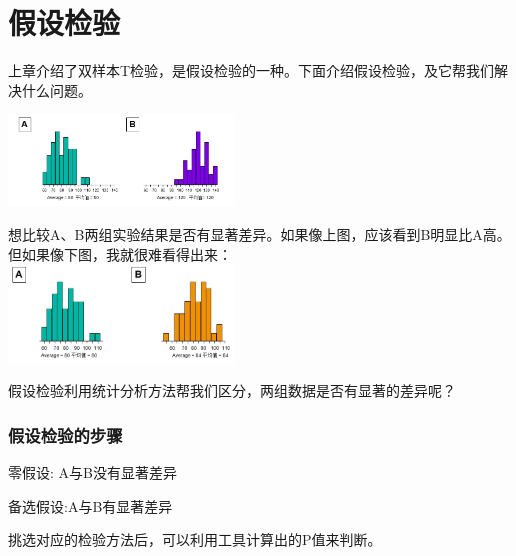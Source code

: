\chapter{假设检验} %

上章介绍了双样本T检验，是假设检验的一种。下面介绍假设检验，及它帮我们解决什么问题。


\includegraphics[width=6cm]{CompareAB1Screenshot_2022-11-06_2119471.jpg}

想比较A、B两组实验结果是否有显著差异。如果像上图，应该看到B明显比A高。\\
但如果像下图，我就很难看得出来：\\

\includegraphics[width=6cm]{CompareAB2Screenshot_2022-11-06_2120361.jpg}

假设检验利用统计分析方法帮我们区分，两组数据是否有显著的差异呢？

\hypertarget{ux5047ux8bbeux68c0ux9a8cux7684ux6b65ux9aa4}{%
\subsection{假设检验的步骤}\label{ux5047ux8bbeux68c0ux9a8cux7684ux6b65ux9aa4}}

零假设: A与B没有显著差异

备选假设:A与B有显著差异

挑选对应的检验方法后，可以利用工具计算出的P值来判断。

\begin{description}
\item[]
\end{description}

